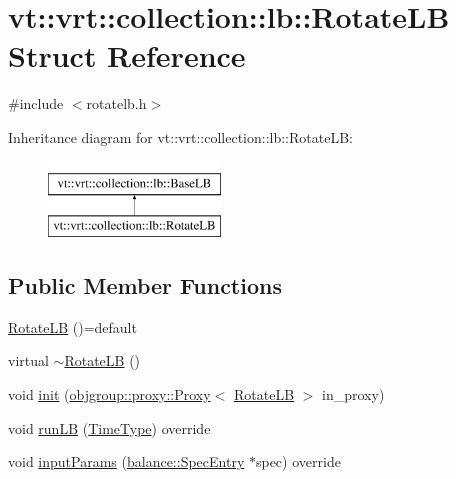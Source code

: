 \hypertarget{structvt_1_1vrt_1_1collection_1_1lb_1_1_rotate_l_b}{}\section{vt\+:\+:vrt\+:\+:collection\+:\+:lb\+:\+:Rotate\+LB Struct Reference}
\label{structvt_1_1vrt_1_1collection_1_1lb_1_1_rotate_l_b}


{\ttfamily \#include $<$rotatelb.\+h$>$}

Inheritance diagram for vt\+:\+:vrt\+:\+:collection\+:\+:lb\+:\+:Rotate\+LB\+:\begin{figure}[H]
\begin{center}
\leavevmode
\includegraphics[height=2.000000cm]{structvt_1_1vrt_1_1collection_1_1lb_1_1_rotate_l_b}
\end{center}
\end{figure}
\subsection*{Public Member Functions}
\begin{DoxyCompactItemize}
\item 
\hyperlink{structvt_1_1vrt_1_1collection_1_1lb_1_1_rotate_l_b_a9cb675c68ec8794d6a2e284ece5de8a8}{Rotate\+LB} ()=default
\item 
virtual \hyperlink{structvt_1_1vrt_1_1collection_1_1lb_1_1_rotate_l_b_ae2a8e40cf47a9ea3be9d4ec6f44d9f50}{$\sim$\+Rotate\+LB} ()
\item 
void \hyperlink{structvt_1_1vrt_1_1collection_1_1lb_1_1_rotate_l_b_a2f0126b5029e1348b86089470ffcd4f2}{init} (\hyperlink{structvt_1_1objgroup_1_1proxy_1_1_proxy}{objgroup\+::proxy\+::\+Proxy}$<$ \hyperlink{structvt_1_1vrt_1_1collection_1_1lb_1_1_rotate_l_b}{Rotate\+LB} $>$ in\+\_\+proxy)
\item 
void \hyperlink{structvt_1_1vrt_1_1collection_1_1lb_1_1_rotate_l_b_af54a83925b1bbe05052c475523110e98}{run\+LB} (\hyperlink{namespacevt_a876a9d0cd5a952859c72de8a46881442}{Time\+Type}) override
\item 
void \hyperlink{structvt_1_1vrt_1_1collection_1_1lb_1_1_rotate_l_b_a70fc0a77f387632fc57805950b63f443}{input\+Params} (\hyperlink{structvt_1_1vrt_1_1collection_1_1balance_1_1_spec_entry}{balance\+::\+Spec\+Entry} $\ast$spec) override
\end{DoxyCompactItemize}
